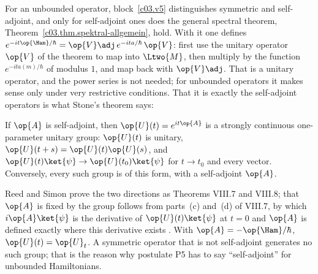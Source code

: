 \begin{vertiefung}[id=c04.v2,
    titel={Unbounded Hamiltonians},
    wozu={In the core $\op{\Ham}$ is a Hermitian matrix, and $e^{-it\op{\Ham}/\hbar}$ is a sum over
      the eigenvectors. The most important Hamiltonians, however, are unbounded. Here is why
      ``Hermitian'' is then no longer enough, and what takes its place.},
    voraussetzung={Section~\ref{c04.s2}; blocks~\ref{c03.v5} and~\ref{c03.v7} (symmetric and
      self-adjoint, spectral theorem). The core does not need this block; Chapters~5 and~9 take
      the subject up again.},
    zurueck={For an unbounded Hamiltonian it has to say: self-adjoint. Exactly the self-adjoint
      operators generate unitary time evolutions.}]
  For an unbounded operator, block~\ref{c03.v5} distinguishes symmetric and self-adjoint, and only
  for self-adjoint ones does the general spectral theorem,
  Theorem~\ref{c03.thm.spektral-allgemein}, hold. With it one defines
  $e^{-it\op{\Ham}/\hbar} = \op{V}\adj\, e^{-ita/\hbar}\, \op{V}$: first use the unitary operator
  $\op{V}$ of the theorem to map into $\Ltwo{M}$, then multiply by the function
  $e^{-ita(m)/\hbar}$ of modulus $1$, and map back with $\op{V}\adj$. That is a unitary operator, and the power series is
  not needed; for unbounded operators it makes sense only under very restrictive conditions. That
  it is exactly the self-adjoint operators is what Stone's theorem says:

  \begin{theorem}[Stone]\label{c04.thm.stone}
    If $\op{A}$ is self-adjoint, then $\op{U}(t) = e^{it\op{A}}$ is a strongly continuous
    one-parameter unitary group: $\op{U}(t)$ is unitary, $\op{U}(t+s) = \op{U}(t)\op{U}(s)$, and
    $\op{U}(t)\ket{\psi} \to \op{U}(t_0)\ket{\psi}$ for $t \to t_0$ and every vector. Conversely,
    every such group is of this form, with a self-adjoint $\op{A}$.
  \end{theorem}

  Reed and Simon prove the two directions as Theorems VIII.7 and VIII.8; that $\op{A}$ is fixed by
  the group follows from parts~(c) and~(d) of VIII.7, by which $i\op{A}\ket{\psi}$ is the
  derivative of $\op{U}(t)\ket{\psi}$ at $t = 0$ and $\op{A}$ is defined exactly where this
  derivative exists
  . With $\op{A} = -\op{\Ham}/\hbar$, $\op{U}(t) = \op{U}_t$.
  A symmetric operator that is not self-adjoint generates no such group; that is the reason why
  postulate P5 has to say ``self-adjoint'' for unbounded Hamiltonians.
\end{vertiefung}

